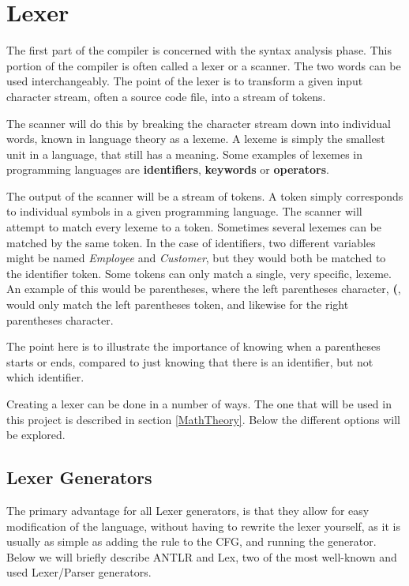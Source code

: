 \section{Lexer}
The first part of the compiler is concerned with the syntax analysis phase.
This portion of the compiler is often called a lexer or a scanner.
The two words can be used interchangeably. 
The point of the lexer is to transform a given input character stream, often a source code file, into a stream of tokens.

The scanner will do this by breaking the character stream down into individual words, known in language theory as a lexeme.
A lexeme is simply the smallest unit in a language, that still has a meaning.
Some examples of lexemes in programming languages are \textbf{identifiers}, \textbf{keywords} or \textbf{operators}.

The output of the scanner will be a stream of tokens.
A token simply corresponds to individual symbols in a given programming language.
The scanner will attempt to match every lexeme to a token.
Sometimes several lexemes can be matched by the same token.
In the case of identifiers, two different variables might be named \textit{Employee} and \textit{Customer}, but they would both be matched to the identifier token.
Some tokens can only match a single, very specific, lexeme.
An example of this would be parentheses, where the left parentheses character, \textbf{(}, would only match the left parentheses token, and likewise for the right parentheses character.

The point here is to illustrate the importance of knowing when a parentheses starts or ends, compared to just knowing that there is an identifier, but not which identifier.


Creating a lexer can be done in a number of ways.
The one that will be used in this project is described in section \ref{MathTheory}.
Below the different options will be explored.
\subsection{Lexer Generators}
The primary advantage for all Lexer generators, is that they allow for easy modification of the language, without having to  rewrite the lexer yourself, as it is usually as simple as adding the rule to the CFG, and running the generator.
Below we will briefly describe ANTLR and Lex, two of the most well-known and used Lexer/Parser generators.

